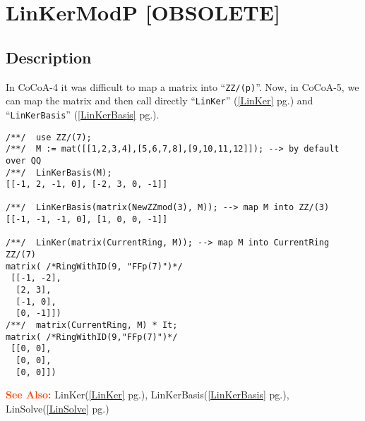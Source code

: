 \documentclass[a4paper]{mybook}
\newenvironment{command}{}{} %
\newcommand\SeeAlso{\par\textcolor{OrangeRed}{\textbf{\large See Also: }}}
\begin{document}
\section{LinKerModP [OBSOLETE]}
\label{LinKerModP [OBSOLETE]}
\begin{command} %



\subsection*{Description}

In CoCoA-4 it was difficult to map a matrix into ``\verb&ZZ/(p)&''.
Now, in CoCoA-5, we can map the matrix and then call directly
``\verb&LinKer&'' (\ref{LinKer} pg.\pageref{LinKer}) and ``\verb&LinKerBasis&'' (\ref{LinKerBasis} pg.\pageref{LinKerBasis}).
\begin{Verbatim}[label=example, rulecolor=\color{PineGreen}, frame=single]
/**/  use ZZ/(7);
/**/  M := mat([[1,2,3,4],[5,6,7,8],[9,10,11,12]]); --> by default over QQ
/**/  LinKerBasis(M);
[[-1, 2, -1, 0], [-2, 3, 0, -1]]

/**/  LinKerBasis(matrix(NewZZmod(3), M)); --> map M into ZZ/(3)
[[-1, -1, -1, 0], [1, 0, 0, -1]]

/**/  LinKer(matrix(CurrentRing, M)); --> map M into CurrentRing ZZ/(7)
matrix( /*RingWithID(9, "FFp(7)")*/
 [[-1, -2],
  [2, 3],
  [-1, 0],
  [0, -1]])
/**/  matrix(CurrentRing, M) * It;
matrix( /*RingWithID(9,"FFp(7)")*/
 [[0, 0],
  [0, 0],
  [0, 0]])
\end{Verbatim}


\SeeAlso %
  LinKer(\ref{LinKer} pg.\pageref{LinKer}), 
    LinKerBasis(\ref{LinKerBasis} pg.\pageref{LinKerBasis}), 
    LinSolve(\ref{LinSolve} pg.\pageref{LinSolve})
\end{command} %
\end{document}
